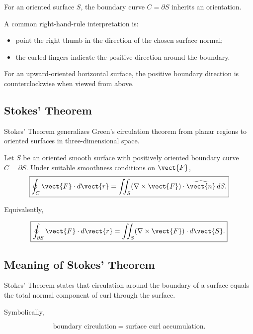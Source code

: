 For an oriented surface \(S\), the boundary curve \(C=\partial S\) inherits
an orientation.

A common right-hand-rule interpretation is:

\begin{itemize}
    \item point the right thumb in the direction of the chosen surface normal;
    \item the curled fingers indicate the positive direction around the
    boundary.
\end{itemize}

For an upward-oriented horizontal surface, the positive boundary direction
is counterclockwise when viewed from above.

\subsection{Stokes' Theorem}
\label{subsec:stokes-theorem}

Stokes' Theorem generalizes Green's circulation theorem from planar regions
to oriented surfaces in three-dimensional space.

\begin{theorem}
Let \(S\) be an oriented smooth surface with positively oriented boundary
curve \(C=\partial S\). Under suitable smoothness conditions on
\(\vect{F}\),
\[ \boxed{
\oint_C\vect{F}\cdot d\vect{r}
=
\iint_S
(\nabla\times\vect{F})\cdot\widehat{\vect{n}}\,dS.
} \]
\end{theorem}

Equivalently,

\[ \boxed{
\oint_{\partial S}\vect{F}\cdot d\vect{r}
=
\iint_S(\nabla\times\vect{F})\cdot d\vect{S}.
} \]

\subsection{Meaning of Stokes' Theorem}
\label{subsec:meaning-stokes-theorem}

Stokes' Theorem states that circulation around the boundary of a surface
equals the total normal component of curl through the surface.

Symbolically,

\[ \boxed{\text{boundary circulation}
=
\text{surface curl accumulation}.} \]

